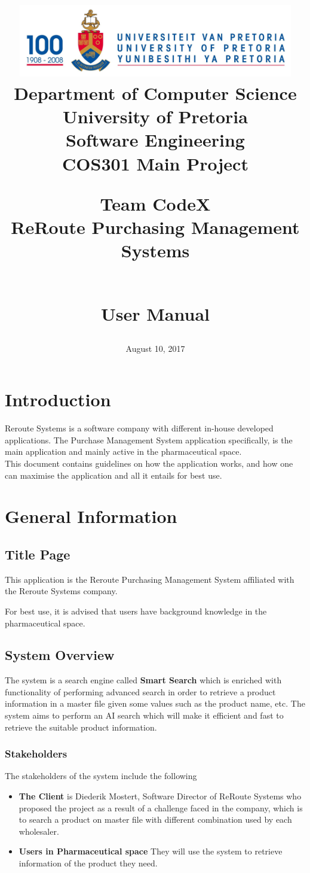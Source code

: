 \documentclass[a4paper,10pt]{article}
\title{\includegraphics[width=12cm]{Eeufeeslogo.jpg} \\
       Department of Computer Science \\
       University of Pretoria \\
       \vspace{0.5cm}
       Software Engineering\\
       COS301 Main Project \\
       \vspace{1.0cm}
       \begin{large} \textbf{Team CodeX}\\ ReRoute Purchasing Management Systems\end{large}\\
       \vspace{1.0cm}
       User Manual \\}
\date{August 10, 2017}
\author{}
\begin{document}
\maketitle
\thispagestyle{empty}
\clearpage

\newpage
{}
\thispagestyle{empty}
\tableofcontents
\clearpage

\newpage
{}

\section{Introduction}
Reroute Systems is a software company with different in-house developed applications. The Purchase Management System 
application specifically, is the main application and mainly active in the pharmaceutical space.\\
This document contains guidelines on how the application works, and how one can maximise the application and all it entails for best use.\\

\section{General Information}
\subsection{Title Page}
This application is the Reroute Purchasing Management System affiliated with the Reroute Systems company.\

For best use, it is advised that users have background knowledge in the pharmaceutical space.\\

\subsection{System Overview}
The system is a search engine called \textbf{Smart Search} which is enriched with functionality of performing advanced search in order to retrieve a product information in a master file given some values such as the product name, etc. The system aims to perform an AI search which will make it efficient and fast to retrieve the suitable product information. \\
	
	\subsubsection{Stakeholders}
	The stakeholders of the system include the following
	\begin{itemize}
	\item \textbf{The Client} is Diederik Mostert, Software Director of ReRoute Systems who proposed the project as a result of a challenge faced in the company, which is to search a product on master file with different combination used by each wholesaler.
	\item \textbf{Users in Pharmaceutical space} They will use the system to retrieve information of the product they need.
	\end{itemize}
\end{document}
